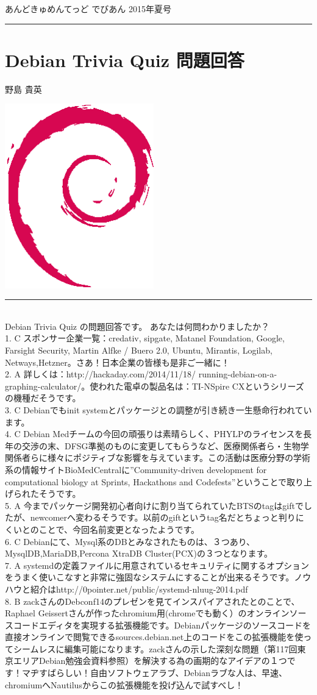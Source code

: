 \documentclass[mingoth,a4paper]{jsarticle}
\renewcommand{\dancersection}[2]{%
\newpage
あんどきゅめんてっど でびあん 2015年夏号
%
\vspace{0.1mm}\\
{\color{dancerdarkblue}\rule{\hsize}{2mm}}

%
%
\begin{minipage}[t]{0.6\hsize}
\color{dancerdarkblue}
\vspace{1cm}
\section{#1}
\hfill{}#2\\
\end{minipage}
\begin{minipage}[t]{0.4\hsize}
\vspace{-2cm}
\hfill{}\includegraphics[height=8cm]{image200502/openlogo-nd.eps}\\
\vspace{-5cm}
\end{minipage}
%
{\color{dancerlightblue}\rule{0.66\hsize}{2mm}}
%
\vspace{2cm}
}
\begin{document}
\dancersection{Debian Trivia Quiz 問題回答}{野島 貴英}
\\
{\small
 Debian Trivia Quiz の問題回答です。 あなたは何問わかりましたか？ \\
1. C スポンサー企業一覧：credativ, sipgate, Matanel Foundation, Google, Farsight Security, Martin Alfke / Buero 2.0, Ubuntu, Mirantis, Logilab, Netways,Hetzner。さあ！日本企業の皆様も是非ご一緒に！\\
2. A 詳しくは：http://hackaday.com/2014/11/18/ running-debian-on-a-graphing-calculator/。使われた電卓の製品名は：TI-NSpire CXというシリーズの機種だそうです。\\
3. C Debianでもinit systemとパッケージとの調整が引き続き一生懸命行われています。\\
4. C Debian Medチームの今回の頑張りは素晴らしく、PHYLPのライセンスを長年の交渉の末、DFSG準拠のものに変更してもらうなど、医療関係者ら・生物学関係者らに様々にポジティブな影響を与えています。この活動は医療分野の学術系の情報サイトBioMedCentralに''Community-driven development for computational biology at Sprints, Hackathons and Codefests''ということで取り上げられたそうです。\\
5. A 今までパッケージ開発初心者向けに割り当てられていたBTSのtagはgiftでしたが、newcomerへ変わるそうです。以前のgiftというtag名だとちょっと判りにくいとのことで、今回名前変更となったようです。\\
6. C Debianにて、Mysql系のDBとみなされたものは、３つあり、MysqlDB,MariaDB,Percona XtraDB Cluster(PCX)の３つとなります。\\
7. A systemdの定義ファイルに用意されているセキュリティに関するオプションをうまく使いこなすと非常に強固なシステムにすることが出来るそうです。ノウハウと紹介はhttp://0pointer.net/public/systemd-nluug-2014.pdf\\
8. B zackさんのDebconf14のプレゼンを見てインスパイアされたとのことで、Raphael Geissertさんが作ったchromium用(chromeでも動く）のオンラインソースコードエディタを実現する拡張機能です。Debianパッケージのソースコードを直接オンラインで閲覧できるsources.debian.net上のコードをこの拡張機能を使ってシームレスに編集可能になります。zackさんの示した深刻な問題（第117回東京エリアDebian勉強会資料参照）を解決する為の画期的なアイデアの１つです！マヂすばらしい！自由ソフトウェアラブ、Debianラブな人は、早速、chromiumへNautilusからこの拡張機能を投げ込んで試すべし！\\
}
\end{document}
